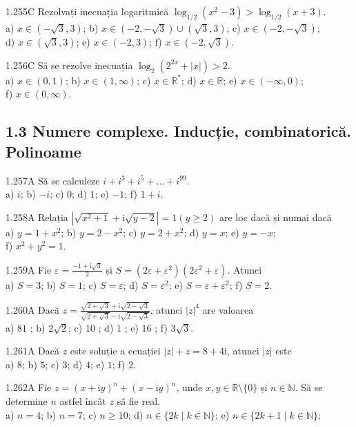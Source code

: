 \documentclass[11pt]{article}
\begin{document}
1.255C Rezolvați inecuația logaritmică $\log _{1 / 2}\left(x^{2}-3\right)>\log _{1 / 2}(x+3)$.\\ a) $x \in(-\sqrt{3}, 3)$; b) $x \in(-2,-\sqrt{3}) \cup(\sqrt{3}, 3)$; c) $x \in(-2,-\sqrt{3})$;\\ d) $x \in(\sqrt{3}, 3)$; e) $x \in(-2,3)$; f) $x \in(-2, \sqrt{3})$.

1.256C Să se rezolve inecuația $\log _{2}\left(2^{2 x}+|x|\right)>2$.\\ a) $x \in(0,1)$; b) $x \in(1, \infty)$; c) $x \in \mathbb{R}^{*}$; d) $x \in \mathbb{R}$; e) $x \in(-\infty, 0)$;\\ f) $x \in(0, \infty)$.

\subsection*{1.3 Numere complexe. Inducție, combinatorică. Polinoame}
1.257A Să se calculeze $i+i^{3}+i^{5}+\ldots+i^{99}$.\\ a) $i$; b) $-i$; c) $0$; d) $1$; e) $-1$; f) $1+i$.

1.258A Relația $\left|\sqrt{x^{2}+1}+\mathrm{i} \sqrt{y-2}\right|=1(y \geq 2)$ are loc dacă și numai dacă\\ a) $y=1+x^{2}$; b) $y=2-x^{2}$; c) $y=2+x^{2}$; d) $y=x$; e) $y=-x$;\\ f) $x^{2}+y^{2}=1$.

1.259A Fie $\varepsilon=\frac{-1+\mathrm{i} \sqrt{3}}{2}$ și $S=\left(2 \varepsilon+\varepsilon^{2}\right)\left(2 \varepsilon^{2}+\varepsilon\right)$. Atunci\\ a) $S=3$; b) $S=1$; c) $S=\varepsilon$; d) $S=\varepsilon^{2}$; e) $S=\varepsilon+\varepsilon^{2}$; f) $S=2$.

1.260A Dacă $z=\frac{\sqrt{2+\sqrt{3}}+\mathrm{i} \sqrt{2-\sqrt{3}}}{\sqrt{2+\sqrt{3}}-\mathrm{i} \sqrt{2-\sqrt{3}}}$, atunci $|z|^{4}$ are valoarea\\ a) $81$ ; b) $2 \sqrt{2}$; c) $10$ ; d) $1$ ; e) $16$ ; f) $3 \sqrt{3}$.

1.261A Dacă $z$ este soluție a ecuației $|z|+z=8+4 \mathrm{i}$, atunci $|z|$ este\\ a) $8$; b) $5$; c) $3$; d) $4$; e) $1$; f) $2$. 

1.262A Fie $z=(x+\mathrm{i} y)^{n}+(x-\mathrm{i} y)^{n}$, unde $x, y \in \mathbb{R} \setminus\{0\}$ și $n \in \mathbb{N}$. Să se determine $n$ astfel încât $z$ să fie real.\\ a) $n=4$; b) $n=7$; c) $n \geq 10$; d) $n \in\{2 k \mid k \in \mathbb{N}\}$; e) $n \in\{2 k+1 \mid k \in \mathbb{N}\}$;
\end{document}
